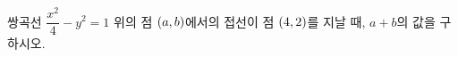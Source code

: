 쌍곡선 $\dfrac{x^2}{4}-y^2=1$ 위의 점 $(a{,}\mkern3mu\mathopen{}b)$에서의 접선이 점 $(4{,}\mkern3mu\mathopen{}2)$를 지날 때, $a+b$의 값을 구하시오.
